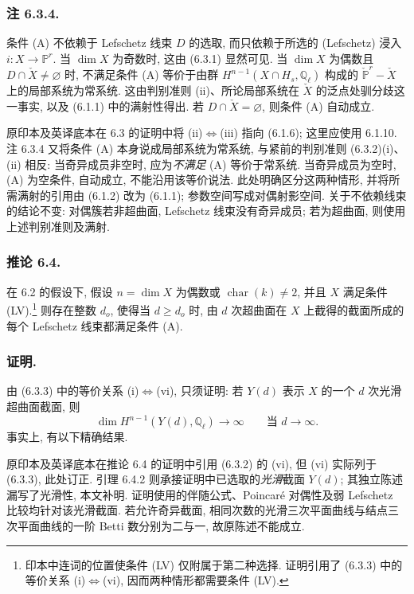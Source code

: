 \subsubsection*{注 6.3.4.}
条件 (A) 不依赖于 Lefschetz 线束 $D$ 的选取, 而只依赖于所选的 (Lefschetz) 浸入 $i:X\longrightarrow\mathbb P^r$. 当 $\dim X$ 为奇数时, 这由 (6.3.1) 显然可见. 当 $\dim X$ 为偶数且 $D\cap\check X\ne\varnothing$ 时, 不满足条件 (A) 等价于由群 $H^{n-1}(X\cap H_s,\mathbb Q_\ell)$ 构成的 $\check{\mathbb P}^{r}-\check X$ 上的局部系统为常系统. 这由判别准则 (ii)、所论局部系统在 $\check X$ 的泛点处驯分歧这一事实, 以及 (6.1.1) 中的满射性得出. 若 $D\cap\check X=\varnothing$, 则条件 (A) 自动成立.

\begin{editorialnote}
原印本及英译底本在 6.3 的证明中将 (ii)$\Longleftrightarrow$(iii) 指向 (6.1.6); 这里应使用 6.1.10. 注 6.3.4 又将条件 (A) 本身说成局部系统为常系统, 与紧前的判别准则 (6.3.2)(i)、(ii) 相反: 当奇异成员非空时, 应为\emph{不满足} (A) 等价于常系统. 当奇异成员为空时, (A) 为空条件, 自动成立, 不能沿用该等价说法. 此处明确区分这两种情形, 并将所需满射的引用由 (6.1.2) 改为 (6.1.1); 参数空间写成对偶射影空间. 关于不依赖线束的结论不变: 对偶簇若非超曲面, Lefschetz 线束没有奇异成员; 若为超曲面, 则使用上述判别准则及满射.
\end{editorialnote}

\subsubsection*{推论 6.4.}
在 6.2 的假设下, 假设 $n=\dim X$ 为偶数或 $\operatorname{char}(k)\ne2$, 并且 $X$ 满足条件 (LV).\footnote{印本中连词的位置使条件 (LV) 仅附属于第二种选择. 证明引用了 (6.3.3) 中的等价关系 (i)$\Longleftrightarrow$(vi), 因而两种情形都需要条件 (LV).}
则存在整数 $d_o$, 使得当 $d\ge d_o$ 时, 由 $d$ 次超曲面在 $X$ 上截得的截面所成的每个 Lefschetz 线束都满足条件 (A).

\subsubsection*{证明.}
由 (6.3.3) 中的等价关系 (i)$\Longleftrightarrow$(vi), 只须证明: 若 $Y(d)$ 表示 $X$ 的一个 $d$ 次光滑超曲面截面, 则
\begin{equation}\tag{6.4.1}
\dim H^{n-1}(Y(d),\mathbb Q_\ell)\longrightarrow\infty
\qquad\text{当 }d\longrightarrow\infty.
\end{equation}
事实上, 有以下精确结果.

\begin{editorialnote}
原印本及英译底本在推论 6.4 的证明中引用 (6.3.2) 的 (vi), 但 (vi) 实际列于 (6.3.3), 此处订正. 引理 6.4.2 则承接证明中已选取的\emph{光滑}截面 $Y(d)$; 其独立陈述漏写了光滑性, 本文补明. 证明使用的伴随公式、Poincar\'e 对偶性及弱 Lefschetz 比较均针对该光滑截面. 若允许奇异截面, 相同次数的光滑三次平面曲线与结点三次平面曲线的一阶 Betti 数分别为二与一, 故原陈述不能成立.
\end{editorialnote}

